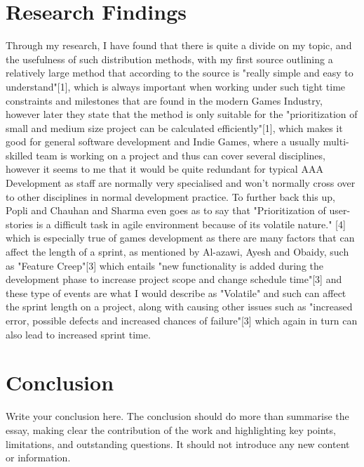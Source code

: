 \documentclass{scrartcl}
\begin{document}
\section{Research Findings}

Through my research, I have found that there is quite a divide on my topic, and the usefulness of such distribution methods, with my first source outlining a relatively large method that according to the source is "really simple and easy to understand"[1], which is always important when working under such tight time constraints and milestones that are found in the modern Games Industry, however later they state that the method is only suitable for the "prioritization of small and medium size project can be calculated efficiently"[1], which makes it good for general software development and Indie Games, where a usually multi-skilled team is working on a project and thus can cover several disciplines, however it seems to me that it would be quite redundant for typical AAA Development as staff are normally very specialised and won't normally cross over to other disciplines in normal development practice. To further back this up, Popli and Chauhan and Sharma even goes as to say that "Prioritization of user-stories is a difficult task in agile environment because of its volatile nature." [4] which is especially true of games development as there are many factors that can affect the length of a sprint, as mentioned by Al-azawi, Ayesh and Obaidy, such as "Feature Creep"[3] which entails "new functionality is added during the development phase to increase project scope and change schedule time"[3] and these type of events are what I would describe as "Volatile" and such can affect the sprint length on a project, along with causing other issues such as "increased error, possible defects and increased chances of failure"[3] which again in turn can also lead to increased sprint time. 

\section{Conclusion}

Write your conclusion here. The conclusion should do more than summarise the essay, making clear the contribution of the work and highlighting key points, limitations, and outstanding questions. It should not introduce any new content or information.

\end{document}

